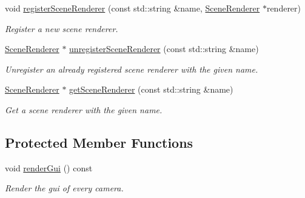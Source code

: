 \begin{DoxyCompactItemize}
void \mbox{\hyperlink{classec_1_1_renderer_a5e40791070a8fcb7250b4544bdac8725}{register\+Scene\+Renderer}} (const std\+::string \&name, \mbox{\hyperlink{classec_1_1_scene_renderer}{Scene\+Renderer}} $\ast$renderer)
\begin{DoxyCompactList}\small\item\em Register a new scene renderer. \end{DoxyCompactList}\item 
\mbox{\hyperlink{classec_1_1_scene_renderer}{Scene\+Renderer}} $\ast$ \mbox{\hyperlink{classec_1_1_renderer_a5c853ee4c34b069cc8142db8409abac6}{unregister\+Scene\+Renderer}} (const std\+::string \&name)
\begin{DoxyCompactList}\small\item\em Unregister an already registered scene renderer with the given name. \end{DoxyCompactList}\item 
\mbox{\hyperlink{classec_1_1_scene_renderer}{Scene\+Renderer}} $\ast$ \mbox{\hyperlink{classec_1_1_renderer_ab4e0c57f9d1f061f97e1fa188d52c477}{get\+Scene\+Renderer}} (const std\+::string \&name)
\begin{DoxyCompactList}\small\item\em Get a scene renderer with the given name. \end{DoxyCompactList}\end{DoxyCompactItemize}
\subsection*{Protected Member Functions}
\begin{DoxyCompactItemize}
\item 
void \mbox{\hyperlink{classec_1_1_renderer_a7dcfbdfd04d48452aba34a591b48341f}{render\+Gui}} () const
\begin{DoxyCompactList}\small\item\em Render the gui of every camera. \end{DoxyCompactList}\end{DoxyCompactItemize}
